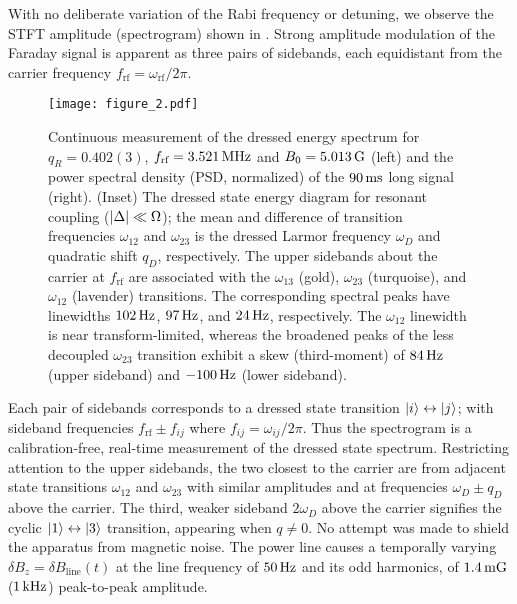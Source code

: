 \documentclass[aps,prl,reprint,superscriptaddress,floatfix]{revtex4-1}
\begin{document}
With no deliberate variation of the Rabi frequency or detuning, we observe the STFT amplitude (spectrogram) shown in .
Strong amplitude modulation of the Faraday signal is apparent as three pairs of sidebands, each equidistant from the carrier frequency $f_{\text{rf}} = \omega_{\text{rf}}/2\pi$. 
\begin{figure}
    \texttt{[image: figure\_2.pdf]}
    \caption{
    \label{fig:static_coupling}
    Continuous measurement of the dressed energy spectrum for $q_R = 0.402(3)$, $f_{\text{rf}}=\unit[3.521]{MHz}$ and $B_0=\unit[5.013]{G}$ (left) and the power spectral density (PSD, normalized) of the $\unit[90]{ms}$ long signal (right). 
    (Inset) The dressed state energy diagram for resonant coupling ($\vert \Delta \vert  \ll \Omega$); the mean and difference of transition frequencies $\omega_{12}$ and $\omega_{23}$ is the dressed Larmor frequency $\omega_D$ and quadratic shift $q_D$, respectively.
    The upper sidebands about the carrier at $f_{\text{rf}}$ are associated with the $\omega_{13}$ (gold), $\omega_{23}$ (turquoise), and $\omega_{12}$ (lavender) transitions.
    The corresponding spectral peaks have linewidths $\unit[102]{Hz}$, $\unit[97]{Hz}$, and $\unit[24]{Hz}$, respectively.
    The $\omega_{12}$ linewidth is near transform-limited, whereas the broadened peaks of the less decoupled $\omega_{23}$ transition exhibit a skew (third-moment) of $\unit[84]{Hz}$ (upper sideband) and $-\unit[100]{Hz}$ (lower sideband).
    }
\end{figure}
Each pair of sidebands corresponds to a dressed state transition $\vert i \rangle  \leftrightarrow \vert j \rangle $; with sideband frequencies  $f_{\text{rf}} \pm f_{ij}$ where $f_{ij} = \omega_{ij}/2\pi$.
Thus the spectrogram is a calibration-free, real-time measurement of the dressed state spectrum.
Restricting attention to the upper sidebands, the two closest to the carrier are from adjacent state transitions $\omega_{12}$ and $\omega_{23}$ with similar amplitudes and at frequencies $\omega_D \pm q_D$ above the carrier.
The third, weaker sideband $2\omega_D$ above the carrier signifies the cyclic $\vert 1 \rangle  \leftrightarrow \vert 3 \rangle $ transition, appearing when $q\neq 0$. 
No attempt was made to shield the apparatus from magnetic noise.
The power line causes a temporally varying $\delta B_z = \delta B_{\text{line}}(t)$ at the line frequency of $\unit[50]{Hz}$ and its odd harmonics, of $\unit[1.4]{mG}$ ($\unit[1]{kHz}$) peak-to-peak amplitude.
\end{document}
